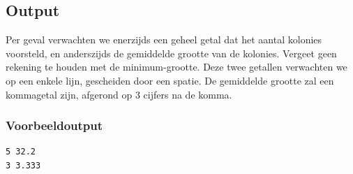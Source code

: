 \subsection*{Output}

Per geval verwachten we enerzijds een geheel getal dat het aantal kolonies
voorsteld, en anderszijds de gemiddelde grootte van de kolonies. Vergeet geen
rekening te houden met de minimum-grootte. Deze twee getallen verwachten we op
een enkele lijn, gescheiden door een spatie. De gemiddelde grootte zal een
kommagetal zijn, afgerond op 3 cijfers na de komma.

\subsubsection*{Voorbeeldoutput}

\begin{verbatim}
5 32.2
3 3.333
\end{verbatim}

